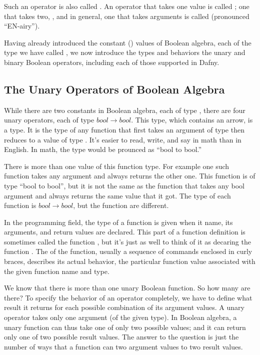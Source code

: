 \documentclass[letterpaper,10pt,english]{sphinxmanual}
\begin{document}
Such an operator is also called . An operator that takes one
value is called ; one that takes two, , and in general,
one that takes  arguments is called  (pronounced “EN-airy”).

Having already introduced the constant () values of Boolean
algebra, each of the type we have called , we now introduce the
types and behaviors the unary and binary Boolean operators, including
each of those supported in Dafny.


\subsection{The Unary Operators of Boolean Algebra}
\label{\detokenize{08-boolean-algebra:the-unary-operators-of-boolean-algebra}}
While there are two constants in Boolean algebra, each of type ,
there are four unary operators, each of type \(bool \rightarrow
bool\). This type, which contains an arrow, is a  type. It is
the type of any function that first takes an argument of type 
then reduces to a value of type . It’s easier to read, write,
and say in math than in English. In math, the type would be prounced
as “bool to bool.”

There is more than one value of this function type. For example one
such function takes any  argument and always returns the other
one. This function is of type “bool to bool”, but it is not the same
as the function that takes any bool argument and always returns the
same value that it got. The type of each function is \(bool
\rightarrow bool\), but the function  are different.

In the programming field, the type of a function is given when it
name, its arguments, and return values are declared. This part of a
function definition is sometimes called the function , but
it’s just as well to think of it as decaring the function .  The
 of the function, usually a sequence of commands enclosed in
curly braces, describes its actual behavior, the particular function
value associated with the given function name and type.

We know that there is more than one unary Boolean function. So how
many are there? To specify the behavior of an operator completely, we
have to define what result it returns for each possible combination of
its argument values. A unary operator takes only one argument (of the
given type). In Boolean algebra, a unary function can thus take one of
only two possible values; and it can return only one of two possible
result values. The answer to the question is just the number of ways
that a function can  two argument values to two result values.
\end{document}
